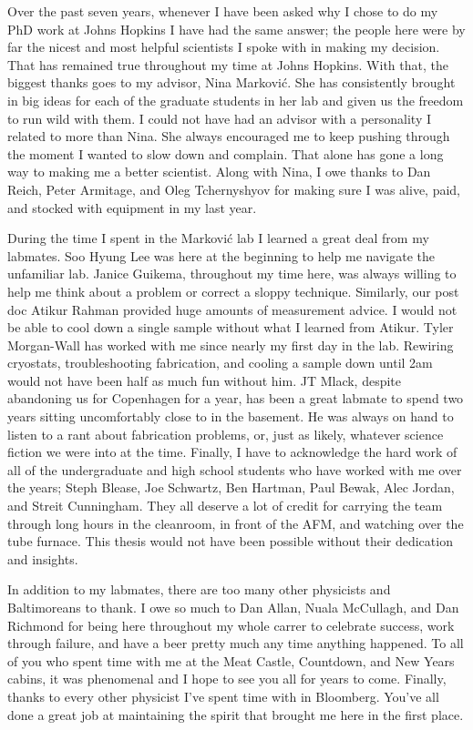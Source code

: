 \begin{frontmatter}
\begin{acknowledgment}
Over the past seven years, whenever I have been asked why I chose to do my PhD work at Johns Hopkins I have had the same answer; the people here were by far the nicest and most helpful scientists I spoke with in making my decision. That has remained true throughout my time at Johns Hopkins. With that, the biggest thanks goes to my advisor, Nina Markovi\'{c}. She has consistently brought in big ideas for each of the graduate students in her lab and given us the freedom to run wild with them. I could not have had an advisor with a personality I related to more than Nina. She always encouraged me to keep pushing through the moment I wanted to slow down and complain. That alone has gone a long way to making me a better scientist. Along with Nina, I owe thanks to Dan Reich, Peter Armitage, and Oleg Tchernyshyov for making sure I was alive, paid, and stocked with equipment in my last year.

During the time I spent in the Markovi\'{c} lab I learned a great deal from my labmates. Soo Hyung Lee was here at the beginning to help me navigate the unfamiliar lab. Janice Guikema, throughout my time here, was always willing to help me think about a problem or correct a sloppy technique. Similarly, our post doc Atikur Rahman provided huge amounts of measurement advice. I would not be able to cool down a single sample without what I learned from Atikur. Tyler Morgan-Wall has worked with me since nearly my first day in the lab. Rewiring cryostats, troubleshooting fabrication, and cooling a sample down until 2am would not have been half as much fun without him. JT Mlack, despite abandoning us for Copenhagen for a year, has been a great labmate to spend two years sitting uncomfortably close to in the basement. He was always on hand to listen to a rant about fabrication problems, or, just as likely, whatever science fiction we were into at the time. Finally, I have to acknowledge the hard work of all of the undergraduate and high school students who have worked with me over the years; Steph Blease, Joe Schwartz, Ben Hartman, Paul Bewak, Alec Jordan, and Streit Cunningham. They all deserve a lot of credit for carrying the team through long hours in the cleanroom, in front of the AFM, and watching over the tube furnace. This thesis would not have been possible without their dedication and insights.

In addition to my labmates, there are too many other physicists and Baltimoreans to thank. I owe so much to Dan Allan, Nuala McCullagh, and Dan Richmond for being here throughout my whole carrer to celebrate success, work through failure, and have a beer pretty much any time anything happened. To all of you who spent time with me at the Meat Castle, Countdown, and New Years cabins, it was phenomenal and I hope to see you all for years to come. Finally, thanks to every other physicist I've spent time with in Bloomberg. You've all done a great job at maintaining the spirit that brought me here in the first place.


\end{acknowledgment}
\end{frontmatter}
